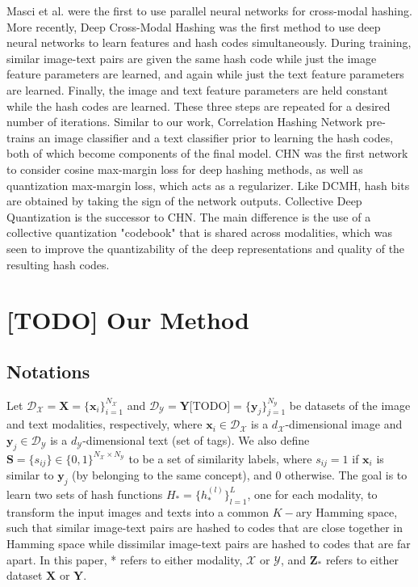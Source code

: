 \documentclass[letterpaper]{article}
\newcommand{\X}{\mathbf{X}}
\newcommand{\Y}{\mathbf{Y}}
\newcommand{\xii}{\mathbf{x}_i}
\newcommand{\yj}{\mathbf{y}_j}
\begin{document}
Masci et al. \cite{masci} were the first to use parallel neural networks for cross-modal hashing. More recently, Deep Cross-Modal Hashing \cite{dcmh} was the first method to use deep neural networks to learn features and hash codes simultaneously. During training, similar image-text pairs are given the same hash code while just the image feature parameters are learned, and again while just the text feature parameters are learned. Finally, the image and text feature parameters are held constant while the hash codes are learned. These three steps are repeated for a desired number of iterations. Similar to our work, Correlation Hashing Network \cite{chn} pre-trains an image classifier and a text classifier prior to learning the hash codes, both of which become components of the final model. CHN was the first network to consider cosine max-margin loss for deep hashing methods, as well as quantization max-margin loss, which acts as a regularizer. Like DCMH, hash bits are obtained by taking the sign of the network outputs. Collective Deep Quantization \cite {cdq} is the successor to CHN. The main difference is the use of a collective quantization "codebook" that is shared across modalities, which was seen to improve the quantizability of the deep representations and quality of the resulting hash codes.

\section{[TODO] Our Method}

\subsection{Notations}

Let $ \mathcal{D}_\mathcal{X} = \X = \{ \xii \}_{i=1}^{N_\mathcal{X}} $ and $ \mathcal{D}_\mathcal{Y} = \Y \text{[TODO]} = \{ \yj \}_{j=1}^{N_\mathcal{Y}} $ be datasets of the image and text modalities, respectively, where $ \xii \in \mathcal{D}_\mathcal{X} $ is a $ d_\mathcal{X} $-dimensional image and $ \yj \in \mathcal{D}_\mathcal{Y} $ is a $ d_\mathcal{Y} $-dimensional text (set of tags). We also define $ \mathbf{S} = \{s_{ij}\} \in \{0,1\}^{N_\mathcal{X} \times N_\mathcal{Y}} $ to be a set of similarity labels, where $ s_{ij} = 1 $ if $ \xii $ is similar to $ \yj $ (by belonging to the same concept), and $ 0 $ otherwise. The goal is to learn two sets of hash functions $ H_* = \{h_*^{(l)}\}_{l=1}^L $, one for each modality, to transform the input images and texts into a common $K-$ary Hamming space, such that similar image-text pairs are hashed to codes that are close together in Hamming space while dissimilar image-text pairs are hashed to codes that are far apart. In this paper, * refers to either modality, $ \mathcal{X} $ or $ \mathcal{Y} $, and $ \mathbf{Z_*} $ refers to either dataset $\X$ or $\Y$.
\end{document}
